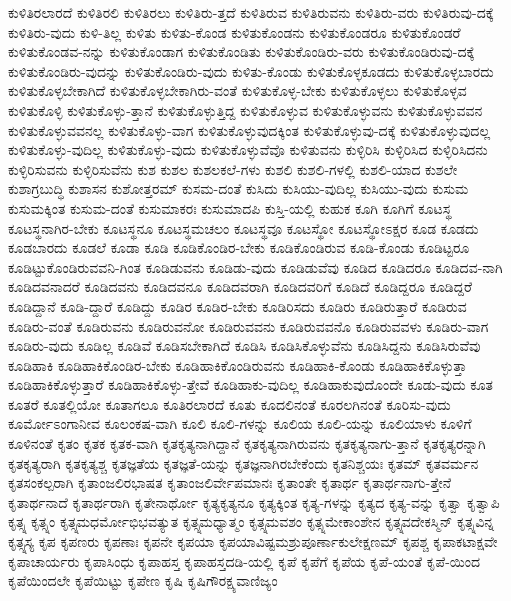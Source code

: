 {ಕುಳಿತಿರಲಾರದೆ
ಕುಳಿತಿರಲಿ
ಕುಳಿತಿರಲು
ಕುಳಿತಿರು-ತ್ತದೆ
ಕುಳಿತಿರುವ
ಕುಳಿತಿರುವನು
ಕುಳಿತಿರು-ವರು
ಕುಳಿತಿರುವು-ದಕ್ಕೆ
ಕುಳಿತಿರು-ವುದು
ಕುಳಿ-ತಿಲ್ಲ
ಕುಳಿತು
ಕುಳಿತು-ಕೊಂಡ
ಕುಳಿತುಕೊಂಡನು
ಕುಳಿತುಕೊಂಡರೂ
ಕುಳಿತುಕೊಂಡರೆ
ಕುಳಿತುಕೊಂಡವ-ನನ್ನು
ಕುಳಿತುಕೊಂಡಾಗ
ಕುಳಿತುಕೊಂಡಿತು
ಕುಳಿತುಕೊಂಡಿರು-ವರು
ಕುಳಿತುಕೊಂಡಿರುವು-ದಕ್ಕೆ
ಕುಳಿತುಕೊಂಡಿರು-ವುದನ್ನು
ಕುಳಿತುಕೊಂಡಿರು-ವುದು
ಕುಳಿತು-ಕೊಂಡು
ಕುಳಿತುಕೊಳ್ಳಕೂಡದು
ಕುಳಿತುಕೊಳ್ಳಬಾರದು
ಕುಳಿತುಕೊಳ್ಳಬೇಕಾಗಿದೆ
ಕುಳಿತುಕೊಳ್ಳಬೇಕಾಗಿರು-ವಂತೆ
ಕುಳಿತುಕೊಳ್ಳ-ಬೇಕು
ಕುಳಿತುಕೊಳ್ಳಲು
ಕುಳಿತುಕೊಳ್ಳವ
ಕುಳಿತುಕೊಳ್ಳಿ
ಕುಳಿತುಕೊಳ್ಳು-ತ್ತಾನೆ
ಕುಳಿತುಕೊಳ್ಳುತ್ತಿದ್ದ
ಕುಳಿತುಕೊಳ್ಳುವ
ಕುಳಿತುಕೊಳ್ಳುವನು
ಕುಳಿತುಕೊಳ್ಳುವವನ
ಕುಳಿತುಕೊಳ್ಳುವವನಲ್ಲ
ಕುಳಿತುಕೊಳ್ಳು-ವಾಗ
ಕುಳಿತುಕೊಳ್ಳುವುದಕ್ಕಿಂತ
ಕುಳಿತುಕೊಳ್ಳುವು-ದಕ್ಕೆ
ಕುಳಿತುಕೊಳ್ಳುವುದಲ್ಲ
ಕುಳಿತುಕೊಳ್ಳು-ವುದಿಲ್ಲ
ಕುಳಿತುಕೊಳ್ಳು-ವುದು
ಕುಳಿತುಕೊಳ್ಳುವೆವೊ
ಕುಳಿತುವನು
ಕುಳ್ಳಿರಿಸಿ
ಕುಳ್ಳಿರಿಸಿದ
ಕುಳ್ಳಿರಿಸಿದನು
ಕುಳ್ಳಿರಿಸುವನು
ಕುಳ್ಳಿರಿಸುವೆನು
ಕುಶ
ಕುಶಲ
ಕುಶಲಕಲೆ-ಗಳು
ಕುಶಲಿ
ಕುಶಲಿ-ಗಳಲ್ಲಿ
ಕುಶಲಿ-ಯಾದ
ಕುಶಲೇ
ಕುಶಾಗ್ರಬುದ್ಧಿ
ಕುಶಾಸನ
ಕುಶೋತ್ತರಮ್
ಕುಸಮ-ದಂತೆ
ಕುಸಿದು
ಕುಸಿಯು-ವುದಿಲ್ಲ
ಕುಸಿಯು-ವುದು
ಕುಸುಮ
ಕುಸುಮಕ್ಕಿಂತ
ಕುಸುಮ-ದಂತೆ
ಕುಸುಮಾಕರಃ
ಕುಸುಮಾದಪಿ
ಕುಸ್ತಿ-ಯಲ್ಲಿ
ಕುಹುಕ
ಕೂಗಿ
ಕೂಗಿಗೆ
ಕೂಟಸ್ಥ
ಕೂಟಸ್ಥನಾಗಿರ-ಬೇಕು
ಕೂಟಸ್ಥನೂ
ಕೂಟಸ್ಥಮಚಲಂ
ಕೂಟಸ್ಥವೂ
ಕೂಟಸ್ಥೋ
ಕೂಟಸ್ಥೋಽಕ್ಷರ
ಕೂಡ
ಕೂಡದು
ಕೂಡಬಾರದು
ಕೂಡಲೆ
ಕೂಡಾ
ಕೂಡಿ
ಕೂಡಿಕೊಂಡಿರ-ಬೇಕು
ಕೂಡಿಕೊಂಡಿರುವ
ಕೂಡಿ-ಕೊಂಡು
ಕೂಡಿಟ್ಟರೂ
ಕೂಡಿಟ್ಟುಕೊಂಡಿರುವವನಿ-ಗಿಂತ
ಕೂಡಿಡುವನು
ಕೂಡಿಡು-ವುದು
ಕೂಡಿಡುವೆವು
ಕೂಡಿದ
ಕೂಡಿದರೂ
ಕೂಡಿದವ-ನಾಗಿ
ಕೂಡಿದವನಾದರೆ
ಕೂಡಿದವನು
ಕೂಡಿದವನೂ
ಕೂಡಿದವರಾಗಿ
ಕೂಡಿದವರಿಗೆ
ಕೂಡಿದೆ
ಕೂಡಿದ್ದರೂ
ಕೂಡಿದ್ದರೆ
ಕೂಡಿದ್ದಾನೆ
ಕೂಡಿ-ದ್ದಾರೆ
ಕೂಡಿದ್ದು
ಕೂಡಿರ
ಕೂಡಿರ-ಬೇಕು
ಕೂಡಿರಿಸದು
ಕೂಡಿರು
ಕೂಡಿರುತ್ತಾರೆ
ಕೂಡಿರುವ
ಕೂಡಿರು-ವಂತೆ
ಕೂಡಿರುವನು
ಕೂಡಿರುವನೋ
ಕೂಡಿರುವವನು
ಕೂಡಿರುವವನೊ
ಕೂಡಿರುವವಳು
ಕೂಡಿರು-ವಾಗ
ಕೂಡಿರು-ವುದು
ಕೂಡಿಲ್ಲ
ಕೂಡಿವೆ
ಕೂಡಿಸಬೇಕಾಗಿದೆ
ಕೂಡಿಸಿ
ಕೂಡಿಸಿಕೊಳ್ಳುವೆನು
ಕೂಡಿಸಿದ್ದನು
ಕೂಡಿಸಿರುವೆವು
ಕೂಡಿಹಾಕಿ
ಕೂಡಿಹಾಕಿಕೊಂಡಿರ-ಬೇಕು
ಕೂಡಿಹಾಕಿಕೊಂಡಿರುವನು
ಕೂಡಿಹಾಕಿ-ಕೊಂಡು
ಕೂಡಿಹಾಕಿಕೊಳ್ಳುತ್ತಾ
ಕೂಡಿಹಾಕಿಕೊಳ್ಳುತ್ತಾರೆ
ಕೂಡಿಹಾಕಿಕೊಳ್ಳು-ತ್ತೇವೆ
ಕೂಡಿಹಾಕು-ವುದಿಲ್ಲ
ಕೂಡಿಹಾಕುವುದೊಂದೇ
ಕೂಡು-ವುದು
ಕೂತ
ಕೂತರೆ
ಕೂತಲ್ಲಿಯೋ
ಕೂತಾಗಲೂ
ಕೂತಿರಲಾರದೆ
ಕೂತು
ಕೂದಲಿನಂತೆ
ಕೂರಲಗಿನಂತೆ
ಕೂರಿಸು-ವುದು
ಕೂರ್ಮೋಽಂಗಾನೀವ
ಕೂಲಂಕಷ-ವಾಗಿ
ಕೂಲಿ
ಕೂಲಿ-ಗಳನ್ನು
ಕೂಲಿಯ
ಕೂಲಿ-ಯನ್ನು
ಕೂಲಿಯಾಳು
ಕೂಳಿಗೆ
ಕೂಳಿನಂತೆ
ಕೃತಂ
ಕೃತಕ
ಕೃತಕ-ವಾಗಿ
ಕೃತಕೃತ್ಯನಾಗಿದ್ದಾನೆ
ಕೃತಕೃತ್ಯನಾಗಿರುವನು
ಕೃತಕೃತ್ಯನಾಗು-ತ್ತಾನೆ
ಕೃತಕೃತ್ಯರನ್ನಾಗಿ
ಕೃತಕೃತ್ಯರಾಗಿ
ಕೃತಕೃತ್ಯಶ್ಚ
ಕೃತಜ್ಞತೆಯ
ಕೃತಜ್ಞತೆ-ಯನ್ನು
ಕೃತಜ್ಞನಾಗಿರಬೇಕೆಂದು
ಕೃತನಿಶ್ಚಯಃ
ಕೃತಮ್
ಕೃತವರ್ಮನ
ಕೃತಸಂಕಲ್ಪರಾಗಿ
ಕೃತಾಂಜಲಿರಭಾಷತ
ಕೃತಾಂಜಲಿರ್ವೇಪಮಾನಃ
ಕೃತಾಂತೇ
ಕೃತಾರ್ಥ
ಕೃತಾರ್ಥನಾಗು-ತ್ತೇನೆ
ಕೃತಾರ್ಥನಾದೆ
ಕೃತಾರ್ಥರಾಗಿ
ಕೃತೇನಾರ್ಥೋ
ಕೃತ್ಯಕೃತ್ಯನೂ
ಕೃತ್ಯಕ್ಕಿಂತ
ಕೃತ್ಯ-ಗಳನ್ನು
ಕೃತ್ಯದ
ಕೃತ್ಯ-ವನ್ನು
ಕೃತ್ವಾ
ಕೃತ್ವಾಪಿ
ಕೃತ್ಸ್ನ
ಕೃತ್ಸ್ನಂ
ಕೃತ್ಸ್ನಮಧರ್ಮೋಭಿಭವತ್ಯುತ
ಕೃತ್ಸ್ನಮಧ್ಯಾತ್ಮಂ
ಕೃತ್ಸ್ನಮವಶಂ
ಕೃತ್ಸ್ನಮೇಕಾಂಶೇನ
ಕೃತ್ಸ್ನವದೇಕಸ್ಮಿನ್
ಕೃತ್ಸ್ನವಿನ್ನ
ಕೃತ್ಸ್ನಸ್ಯ
ಕೃಪ
ಕೃಪಣರು
ಕೃಪಣಾಃ
ಕೃಪನೇ
ಕೃಪಯಾ
ಕೃಪಯಾವಿಷ್ಟಮಶ್ರುಪೂರ್ಣಾಕುಲೇಕ್ಷಣಮ್
ಕೃಪಶ್ಚ
ಕೃಪಾಕಟಾಕ್ಷವೇ
ಕೃಪಾಚಾರ್ಯರು
ಕೃಪಾಸಿಂಧು
ಕೃಪಾಹಸ್ತ
ಕೃಪಾಹಸ್ತದಡಿ-ಯಲ್ಲಿ
ಕೃಪೆ
ಕೃಪೆಗೆ
ಕೃಪೆಯ
ಕೃಪೆ-ಯಂತೆ
ಕೃಪೆ-ಯಿಂದ
ಕೃಪೆಯಿಂದಲೇ
ಕೃಪೆಯಿಟ್ಟು
ಕೃಪೇಣ
ಕೃಷಿ
ಕೃಷಿಗೌರಕ್ಷ್ಯವಾಣಿಜ್ಯಂ
}
